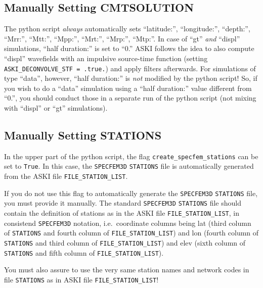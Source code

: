 \documentclass[12pt,a4paper]{article}
\newcommand{\lcode}[1]{\nolinkurl{#1}}
\newcommand{\lcodetitle}[1]{ {\ttfamily #1} }
\newcommand{\ASKI}{ {\ttfamily ASKI} }
\begin{document}
%
\subsection{Manually Setting \lcodetitle{CMTSOLUTION}}
%
The python script \emph{always} automatically sets ``latitude:'', ``longitude:'', ``depth:'', 
``Mrr:'', ``Mtt:'', ``Mpp:'', ``Mrt:'', ``Mrp:'', ``Mtp:''. In case of ``gt'' \emph{and} ``displ'' simulations,  
``half duration:'' is set to ``0.''
\ASKI{} follows the idea to also compute ``displ'' wavefields 
with an impulsive source-time function (setting \lcode{ASKI_DECONVOLVE_STF = .true.}) and apply filters
afterwards.
For simulations of type ``data'', however, ``half duration:'' is \emph{not} modified by the python script!
So, if you wish to do a ``data'' simulation using a ``half duration:'' value different from ``0.'', you 
should conduct those in a separate run of the python script (not mixing with ``displ'' or ``gt'' simulations).
%
\subsection{Manually Setting \lcodetitle{STATIONS}}
%
In the upper part of the python script, the flag \lcode{create_specfem_stations} can be set to \lcode{True}.
In this case, the \lcode{SPECFEM3D} \lcode{STATIONS} file is automatically generated from the 
\ASKI{} file \lcode{FILE_STATION_LIST}.

If you do not use this flag to automatically generate the \lcode{SPECFEM3D} \lcode{STATIONS} file,
you must provide it manually.
The standard \lcode{SPECFEM3D} \lcode{STATIONS} file should contain the definition of stations as
in the \ASKI{} file \lcode{FILE_STATION_LIST}, in consistend \lcode{SPECFEM3D} notation, i.e.\ coordinate
columns being lat (third column of \lcode{STATIONS} and fourth column of \lcode{FILE_STATION_LIST}) and 
lon (fourth column of \lcode{STATIONS} and third column of \lcode{FILE_STATION_LIST}) and 
elev (sixth column of \lcode{STATIONS} and fifth column of \lcode{FILE_STATION_LIST}). 

You must also assure to use the very same station names and network codes in file \lcode{STATIONS} as in 
\ASKI{} file \lcode{FILE_STATION_LIST}!
%
\end{document}
